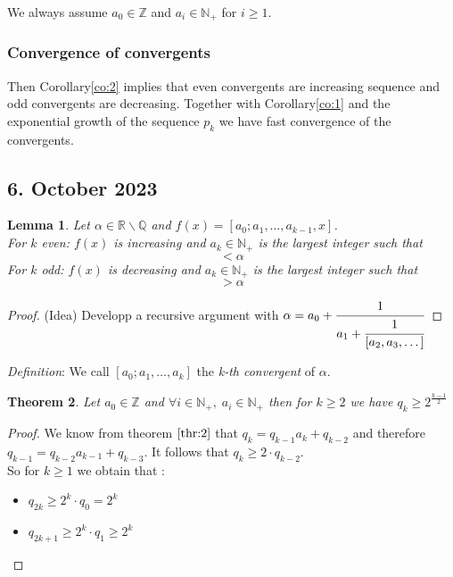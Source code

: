 \documentclass[a4paper,11pt,american]{article}
\newcommand{\N}{\mathbb{N}}
\newcommand{\Q}{\mathbb{Q}}
\newcommand{\R}{\mathbb{R}}
\newcommand{\Z}{\mathbb{Z}}
\theoremstyle{plain}
\newtheorem{theorem}{Theorem}
\newtheorem{lemma}[theorem]{Lemma}
\theoremstyle{definition}
\begin{document}
We always assume $a_0\in\Z$ and $a_i \in \N_+$ for $i\geq1$.





\subsubsection*{Convergence of convergents}

Then Corollary\eqref{co:2} implies that even convergents are increasing sequence and odd convergents are decreasing. Together with Corollary\eqref{co:1} and the exponential growth of the sequence $p_k$ we have fast convergence of the convergents.



\subsection*{6. October 2023}
\begin{lemma}\label{lem:7}
Let $\alpha\in\R\backslash\Q$ and $f(x)=[a_0;a_1,\dots,a_{k-1},x]$.\\
For $k$ even: $f(x)$ is increasing and $a_k\in \N_+$ is the largest integer such that \begin{equation}
    [a_0;a_1,\dots,a_k]<\alpha
\end{equation}
For $k$ odd: $f(x)$ is decreasing and $a_k\in \N_+$ is the largest integer such that \begin{equation}
    [a_0;a_1,\dots,a_k]>\alpha
\end{equation}
\end{lemma}
\begin{proof} (Idea)
    Developp a recursive argument with $\alpha=a_0+\cfrac{1}{a_1+\cfrac{1}{[a_2,a_3,\dots]}}$
\end{proof}
\emph{Definition}: We call $[a_0;a_1,\dots,a_k]$ the \emph{k-th convergent} of $\alpha$.
\begin{theorem}\label{th:8}
    Let $a_0\in\Z$ and $\forall i\in\N_+,\; a_i\in\N_+$ then for $k\geq 2$ we have $q_k\geq 2^{\frac{k-1}{2}}$
\end{theorem}
\begin{proof}
    We know from theorem $\eqref{thr:2}$ that $ q_ k =  q_{k-1} a_k + q_{k-2}$ and therefore $ q_ {k-1}  =  q_{k-2} a_{k-1} + q_{k-3}$. It follows that $q_k\geq 2\cdot q_{k-2}$.\\
    So for $k\geq 1$ we obtain that :\begin{itemize}
        \item $q_{2k}\geq 2^k\cdot q_0=2^k$
        \item $q_{2k+1}\geq 2^k\cdot q_1\geq 2^k$
    \end{itemize}
\end{proof}
\end{document}
